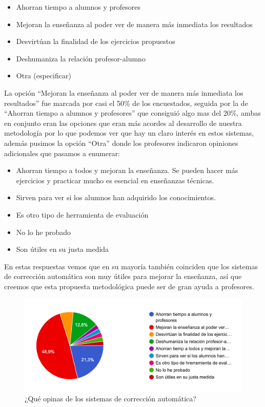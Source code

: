 \begin{enumerate}
\begin{itemize}
    \item Ahorran tiempo a alumnos y profesores
    \item Mejoran la enseñanza al poder ver de manera más inmediata los resultados
    \item Desvirtúan la finalidad de los ejercicios propuestos
    \item Deshumaniza la relación profesor-alumno
    \item Otra (especificar)
\end{itemize}

La opción ``Mejoran la enseñanza al poder ver de manera más inmediata los resultados'' fue marcada por casi el 50\% de los encuestados, seguida por la de ``Ahorran tiempo a alumnos y profesores'' que consiguió algo mas del 20\%, ambas en conjunto eran las opciones que eran más acordes al desarrollo de nuestra metodología por lo que podemos ver que hay un claro interés en estos sistemas, además pusimos la opción ``Otra'' donde los profesores indicaron opiniones adicionales que pasamos a enumerar:

\begin{itemize}
    \item Ahorran tiempo a todos y mejoran la enseñanza. Se pueden hacer más ejercicios y practicar mucho es esencial en enseñanzas técnicas.
    \item Sirven para ver si los alumnos han adquirido los conocimientos.
    \item Es otro tipo de herramienta de evaluación
    \item No lo he probado
    \item Son útiles en su justa medida
\end{itemize}

En estas respuestas vemos que en su mayoría también coinciden que los sistemas de corrección automática son muy útiles para mejorar la enseñanza, así que creemos que esta propuesta metodológica puede ser de gran ayuda a profesores.

\begin{figure}[H]
\centering
\includegraphics[width=1.0\textwidth]{../images/quiz_6}
\caption{¿Qué opinas de los sistemas de corrección automática?}
\label{fig:quiz_6}
\end{figure}


\end{enumerate}
